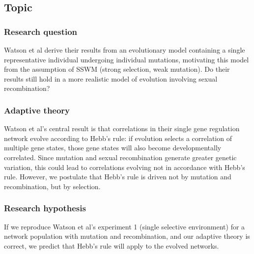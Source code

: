 \documentclass{article}
\begin{document}
\subsection{Topic}
\subsubsection{Research question}
Watson et al derive their results from an evolutionary model containing a single representative individual undergoing individual mutations, motivating this model from the assumption of SSWM (strong selection, weak mutation). Do their results still hold in a more realistic model of evolution involving sexual recombination?

\subsubsection{Adaptive theory}
Watson et al’s central result is that correlations in their single gene regulation network evolve according to Hebb’s rule: if evolution selects a correlation of multiple gene states, those gene states will also become developmentally correlated. Since mutation and sexual recombination generate greater genetic variation, this could lead to correlations evolving not in accordance with Hebb's rule. However, we postulate that Hebb’s rule is driven not by mutation and recombination, but by selection.

\subsubsection{Research hypothesis}
If we reproduce Watson et al’s experiment 1 (single selective environment) for a network population with mutation and recombination, and our adaptive theory is correct, we predict that Hebb’s rule will apply to the evolved networks.








\begin{appendix}
  \listoffigures
  \listoftables
   
  
\end{appendix}
\end{document}
